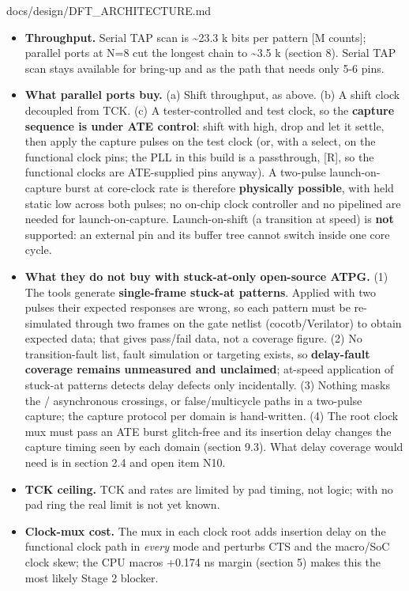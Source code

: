 \begin{relocated}{docs/design/DFT_ARCHITECTURE.md}
\begin{itemize}
\tightlist
\item
  \textbf{Throughput.} Serial TAP scan is \textasciitilde23.3 k bits per
  pattern {[}M counts{]}; parallel ports at N=8 cut the longest chain to
  \textasciitilde3.5 k (section 8). Serial TAP scan stays available for
  bring-up and as the path that needs only 5-6 pins.
\item
  \textbf{What parallel ports buy.} (a) Shift throughput, as above. (b)
  A shift clock decoupled from TCK. (c) A tester-controlled
   and test clock, so the \textbf{capture sequence is
  under ATE control}: shift with  high, drop
   and let it settle, then apply the capture pulses on
  the test clock (or, with a select, on the functional clock pins; the
  PLL in this build is a passthrough, 
  {[}R{]}, so the functional clocks are ATE-supplied pins anyway). A
  two-pulse launch-on-capture burst at core-clock rate is therefore
  \textbf{physically possible}, with  held static low
  across both pulses; no on-chip clock controller and no pipelined
   are needed for launch-on-capture. Launch-on-shift (a
   transition at speed) is \textbf{not} supported: an
  external pin and its buffer tree cannot switch inside one core cycle.
\item
  \textbf{What they do not buy with stuck-at-only open-source ATPG.} (1)
  The tools generate \textbf{single-frame stuck-at patterns}. Applied
  with two pulses their expected responses are wrong, so each pattern
  must be re-simulated through two frames on the gate netlist
  (cocotb/\allowbreak{}Verilator) to obtain expected data; that gives
  pass/fail data, not a coverage figure. (2) No transition-fault list,
  fault simulation or targeting exists, so \textbf{delay-fault coverage
  remains unmeasured and unclaimed}; at-speed application of stuck-at
  patterns detects delay defects only incidentally. (3) Nothing masks
  the / asynchronous crossings,
   or false/\allowbreak{}multicycle paths in a two-pulse
  capture; the capture protocol per domain is hand-written. (4) The root
  clock mux must pass an ATE burst glitch-free and its insertion delay
  changes the capture timing seen by each domain (section 9.3). What
  delay coverage would need is in section 2.4 and open item N10.
\item
  \textbf{TCK ceiling.} TCK and  rates are limited by
  pad timing, not logic; with no pad ring the real limit is not yet
  known.
\item
  \textbf{Clock-mux cost.} The mux in each clock root adds insertion
  delay on the functional clock path in \emph{every} mode and perturbs
  CTS and the macro/SoC clock skew; the CPU macro\textquotesingle s
  +0.174 ns margin (section 5) makes this the most likely Stage 2
  blocker.
\end{itemize}


\end{relocated}
